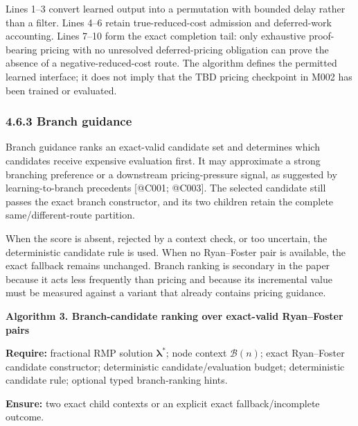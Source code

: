 \documentclass[
  11pt,
]{article}
\begin{document}
Lines 1--3 convert learned output into a permutation with bounded delay
rather than a filter. Lines 4--6 retain true-reduced-cost admission and
deferred-work accounting. Lines 7--10 form the exact completion tail:
only exhaustive proof-bearing pricing with no unresolved
deferred-pricing obligation can prove the absence of a
negative-reduced-cost route. The algorithm defines the permitted learned
interface; it does not imply that the TBD pricing checkpoint in M002 has
been trained or evaluated.

\hypertarget{branch-guidance}{%
\subsubsection{4.6.3 Branch guidance}\label{branch-guidance}}

Branch guidance ranks an exact-valid candidate set and determines which
candidates receive expensive evaluation first. It may approximate a
strong branching preference or a downstream pricing-pressure signal, as
suggested by learning-to-branch precedents {[}@C001; @C003{]}. The
selected candidate still passes the exact branch constructor, and its
two children retain the complete same/different-route partition.

When the score is absent, rejected by a context check, or too uncertain,
the deterministic candidate rule is used. When no Ryan--Foster pair is
available, the exact fallback remains unchanged. Branch ranking is
secondary in the paper because it acts less frequently than pricing and
because its incremental value must be measured against a variant that
already contains pricing guidance.

\textbf{Algorithm 3. Branch-candidate ranking over exact-valid
Ryan--Foster pairs}

\textbf{Require:} fractional RMP solution \(\boldsymbol{\lambda}^{*}\);
node context \(\mathcal{B}(n)\); exact Ryan--Foster candidate
constructor; deterministic candidate/evaluation budget; deterministic
candidate rule; optional typed branch-ranking hints.

\textbf{Ensure:} two exact child contexts or an explicit exact
fallback/incomplete outcome.
\end{document}
